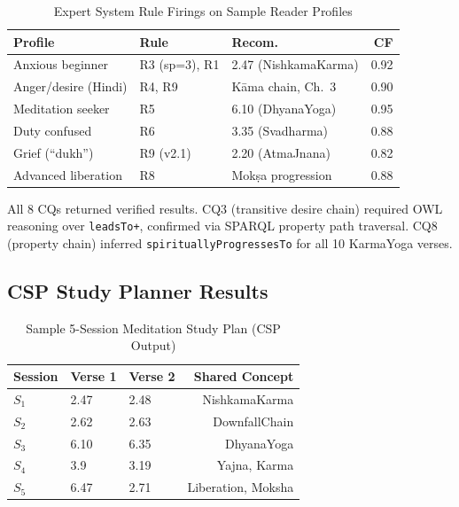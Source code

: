 \documentclass[conference]{IEEEtran}
\begin{document}
\begin{table}[htbp]
\caption{Expert System Rule Firings on Sample Reader Profiles}
\label{tab:expert}
\centering
\begin{tabular}{p{2.0cm}p{1.3cm}p{2.2cm}r}
\toprule
\textbf{Profile} & \textbf{Rule} & \textbf{Recom.} & \textbf{CF} \\
\midrule
Anxious beginner     & R3 (sp=3), R1 & 2.47 (NishkamaKarma) & 0.92 \\
Anger/desire (Hindi) & R4, R9        & K\={a}ma chain, Ch.~3 & 0.90 \\
Meditation seeker    & R5            & 6.10 (DhyanaYoga)    & 0.95 \\
Duty confused        & R6            & 3.35 (Svadharma)     & 0.88 \\
Grief (``dukh'')     & R9 (v2.1)     & 2.20 (AtmaJnana)     & 0.82 \\
Advanced liberation  & R8            & Mok\d{s}a progression & 0.88 \\
\bottomrule
\end{tabular}
\end{table}

All 8 CQs returned verified results. CQ3 (transitive desire chain)
required OWL reasoning over \texttt{leadsTo+}, confirmed via SPARQL
property path traversal. CQ8 (property chain) inferred
\texttt{spirituallyProgressesTo} for all 10 KarmaYoga verses.

\subsection{CSP Study Planner Results}

\begin{table}[htbp]
\caption{Sample 5-Session Meditation Study Plan (CSP Output)}
\label{tab:csp}
\centering
\begin{tabular}{lllr}
\toprule
\textbf{Session} & \textbf{Verse 1} & \textbf{Verse 2} & \textbf{Shared Concept} \\
\midrule
$S_1$ & 2.47 & 2.48 & NishkamaKarma \\
$S_2$ & 2.62 & 2.63 & DownfallChain \\
$S_3$ & 6.10 & 6.35 & DhyanaYoga \\
$S_4$ & 3.9  & 3.19 & Yajna, Karma \\
$S_5$ & 6.47 & 2.71 & Liberation, Moksha \\
\bottomrule
\end{tabular}
\end{table}
\end{document}
